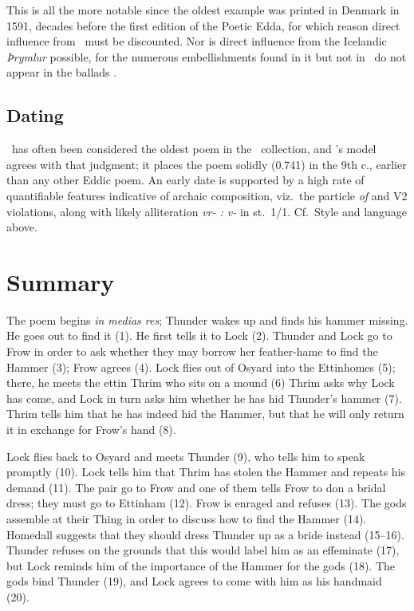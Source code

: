 This is all the more notable since the oldest example was printed in Denmark in 1591, decades before the first edition of the Poetic Edda, for which reason direct influence from \Thrymskvida\ must be discounted.  Nor is direct influence from the Icelandic \emph{Þrymlur} possible, for the numerous embellishments found in it but not in \Thrymskvida\ do not appear in the ballads \parencite[41--42]{Vijunas2019}.

\subsection{Dating}

\Thrymskvida\ has often been considered the oldest poem in the \Regius\ collection, and \textcite{Sapp2022}’s model agrees with that judgment; it places the poem solidly (0.741) in the 9th c., earlier than any other Eddic poem.  An early date is supported by a high rate of quantifiable features indicative of archaic composition, viz.~the particle \emph{of} and V2 violations, along with likely alliteration \emph{vr- : v-} in st.~1/1.  Cf.~Style and language above.

\section{Summary}

The poem begins \emph{in medias res}; Thunder wakes up and finds his hammer missing.  He goes out to find it (1).  He first tells it to Lock (2).  Thunder and Lock go to Frow in order to ask whether they may borrow her feather-hame to find the Hammer (3); Frow agrees (4).  Lock flies out of Osyard into the Ettinhomes (5); there, he meets the ettin Thrim who sits on a mound (6)  Thrim asks why Lock has come, and Lock in turn asks him whether he has hid Thunder’s hammer (7).  Thrim tells him that he has indeed hid the Hammer, but that he will only return it in exchange for Frow’s hand (8).

Lock flies back to Osyard and meets Thunder (9), who tells him to speak promptly (10).  Lock tells him that Thrim has stolen the Hammer and repeats his demand (11). The pair go to Frow and one of them tells Frow to don a bridal dress; they must go to Ettinham (12).  Frow is enraged and refuses (13).  The gods assemble at their Thing in order to discuss how to find the Hammer (14).  Homedall suggests that they should dress Thunder up as a bride instead (15--16).  Thunder refuses on the grounds that this would label him as an effeminate (17), but Lock reminds him of the importance of the Hammer for the gods (18).  The gods bind Thunder (19), and Lock agrees to come with him as his handmaid (20).

